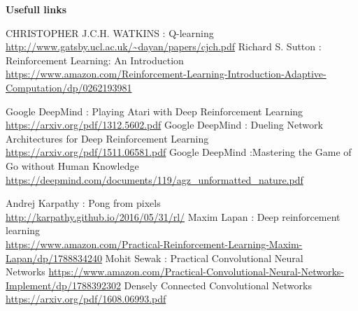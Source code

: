 \documentclass[xcolor=dvipsnames]{beamer}
\begin{document}
\begin{frame}{\bf Usefull links}

{\tiny
  \begin{thebibliography}{9}
    \bibitem {}CHRISTOPHER  J.C.H. WATKINS : Q-learning \\ \url{http://www.gatsby.ucl.ac.uk/~dayan/papers/cjch.pdf}
    \bibitem {}Richard S. Sutton : Reinforcement Learning: An Introduction \\ \url{https://www.amazon.com/Reinforcement-Learning-Introduction-Adaptive-Computation/dp/0262193981}

    \bibitem {}Google DeepMind : Playing Atari with Deep Reinforcement Learning \\ \url{https://arxiv.org/pdf/1312.5602.pdf}
    \bibitem {}Google DeepMind : Dueling Network Architectures for Deep Reinforcement Learning \\ \url{https://arxiv.org/pdf/1511.06581.pdf}
    \bibitem {}Google DeepMind :Mastering the Game of Go without Human Knowledge \\ \url{https://deepmind.com/documents/119/agz_unformatted\_nature.pdf}

    \bibitem {}Andrej Karpathy : Pong from pixels \\ \url{http://karpathy.github.io/2016/05/31/rl/}
    \bibitem {}Maxim Lapan : Deep reinforcement learning \\ \url{https://www.amazon.com/Practical-Reinforcement-Learning-Maxim-Lapan/dp/1788834240}
    \bibitem {}Mohit Sewak : Practical Convolutional Neural \\ Networks \url{https://www.amazon.com/Practical-Convolutional-Neural-Networks-Implement/dp/1788392302}
    \bibitem {}Densely Connected Convolutional Networks \\ \url{https://arxiv.org/pdf/1608.06993.pdf}
  \end{thebibliography}
}

\end{frame}
\end{document}
